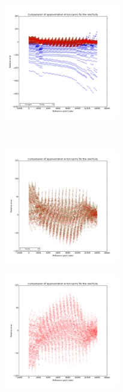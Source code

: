 \begin{center}
\begin{figure}[!h]
\begin{subfigure}[b]{0.45\textwidth}
		\end{subfigure}
\end{figure}
\label{figure:results}
\end{center}
\begin{center}
\begin{figure}[!h]\ContinuedFloat
		\centering
		\begin{subfigure}[b]{0.45\textwidth}
				\includegraphics[width=\linewidth,height=5cm]{images/MOX/ReactivityError_with_cocagne.png}
		\end{subfigure}
		~
		\begin{subfigure}[b]{0.45\textwidth}
				\includegraphics[width=\linewidth,height=5cm]{images/MOX/ReactivityError.png}
		\end{subfigure}
		\begin{subfigure}[b]{0.45\textwidth}
				\includegraphics[width=\linewidth,height=5cm]{images/MOX/ReactivityError_alone.png}
		\end{subfigure}
\end{figure}
\label{figure:reactivity}
\end{center}



